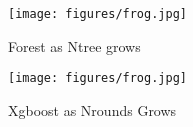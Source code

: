    
            



   
    

    \begin{figure}
    \centering
    \begin{minipage}{0.45\textwidth}
        \centering
        \texttt{[image: figures/frog.jpg]} %
        \caption{Forest as Ntree grows}
       \label{fig:hw-04_q-01e_forest}
    \end{minipage}\hfill
    \begin{minipage}{0.45\textwidth}
        \centering
        \texttt{[image: figures/frog.jpg]} %
        \caption{Xgboost as Nrounds Grows}
    \end{minipage}
    \label{fig:hw-04_q-01e_xg}
\end{figure}



